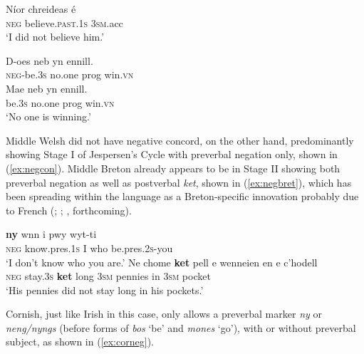 \documentclass[output=paper,colorlinks,citecolor=brown]{langscibook}
\begin{document}
\ea
\settowidth{}
\gll Níor chreideas é \\
\textsc{neg} believe.\textsc{past}.\textsc{1s} \textsc{3sm}.acc\\ 
\glt `I did not believe him.'
\label{ex:NMU-irish}
\z

\ea 
\ea
\settowidth{}
\gll D-oes neb yn ennill. \\
\textsc{neg}-be.\textsc{3s} no.one prog win.\textsc{vn}\\ 
\ex 
\gll *Mae neb yn ennill.\\
be.\textsc{3s} no.one prog win.\textsc{vn}\\
\glt `No one is winning.' 
\z
\label{ex:NMU-welsh}
\z

\noindent Middle Welsh did not have negative concord, on the other hand, predominantly showing Stage I of Jespersen's Cycle with preverbal negation only, shown in (\ref{ex:negcon}). Middle Breton already appears to be in Stage II showing both preverbal negation as well as postverbal \textit{ket}, shown in (\ref{ex:negbret}), which has been spreading within the language as a Breton-specific innovation probably due to French (\cite[281--286]{mm:hemon_historical_1975}; \cite[103--105]{mm:poppe_negation_1995}; \citealt{mm:willis_negation_2006}, forthcoming).

\ea 
\ea
\settowidth{}
\gll \textbf{ny} wnn i pwy wyt-ti \\
\textsc{neg} know.pres.\textsc{1s} I who be.pres.\textsc{2s}-you\\
\glt `I don't know who you are.'
\label{ex:negcon}
\ex 
\gll Ne chome \textbf{ket} pell e wenneien en e c'hodell \\
\textsc{neg} stay.\textsc{3s} \textbf{ket} long \textsc{3sm} pennies in \textsc{3sm} pocket\\ 
\glt `His pennies did not stay long in his pockets.' 
\label{ex:negbret}
\z
\z

Cornish, just like Irish in this case, only allows a preverbal marker \textit{ny} or \textit{neng/nyngs} (before forms of \textit{bos} `be' and \textit{mones} `go'), with or without preverbal subject, as shown in (\ref{ex:corneg}).
\end{document}
